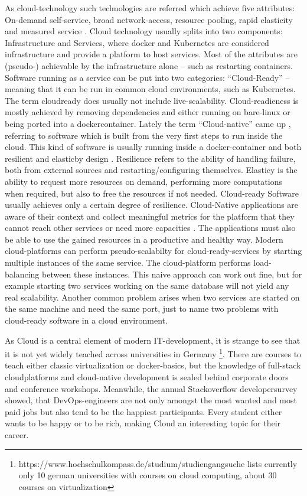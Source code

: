 \documentclass[utf8]{lni}
\begin{document}
As cloud-technology such technologies are referred which achieve five attributes: 
On-demand self-service, broad network-access, resource pooling, rapid elasticity and measured service \cite{ME11}. 
Cloud technology usually splits into two components:  Infrastructure  and  Services,  where  docker and Kubernetes are considered infrastructure and provide a  platform  to  host  services.  
Most  of  the  attributes  are (pseudo-) achievable by the infrastructure alone – such as restarting containers. 
Software running as a service can be put into two categories: 
“Cloud-Ready” – meaning that it can be run in common cloud environments, such as Kubernetes. 
The term cloudready  does  usually  not  include  live-scalability. Cloud-readieness is mostly achieved by removing dependencies and either running on bare-linux or being ported into a dockercontainer. 
Lately the term “Cloud-native” came up \cite{BI17}, referring to software which is built from the very first steps to run inside the cloud. This kind of software is usually running inside a docker-container and both resilient and elasticby design \cite{TO17}.  
Resilience refers to the ability of handling failure, both from external sources and restarting/configuring themselves.  
Elasticy is the ability to request more resources on demand, performing more computations when required, but also to free the resources if not needed. 
Cloud-ready Software usually achieves only a certain degree of resilience.   
Cloud-Native applications are aware of their context and collect meaningful metrics for the platform that they cannot reach other services or need more capacities \cite{MIN18}. 
The applications must also be able to use the gained resources in a productive and healthy way.  
Modern  cloud-platforms  can  perform  pseudo-scalabilty for cloud-ready-services by starting multiple instances of the same service. 
The cloud-platform performs load-balancing between these instances. 
This naive approach can work out fine, but for example starting two services working on the same database will not yield any real scalability. 
Another common problem arises when two services are started on the same machine and need the same port, just to name two problems with cloud-ready  software in a cloud environment. 

As Cloud is a central element of modern IT-development, it is strange to see that it is not yet widely teached across 
universities in Germany \footnote{https://www.hochschulkompass.de/studium/studiengangsuche lists currently only 10 german universities with courses on cloud computing, about 30 courses on virtualization }.
There are courses to teach either classic virtualization or docker-basics, but the knowledge of full-stack cloudplatforms and cloud-native development is sealed behind corporate doors and conference workshops.
Meanwhile,  the  annual  Stackoverflow  developersurvey \cite{SO19} showed, that DevOps-engineers are not only 
amongst the most wanted and most paid jobs but also tend to be the happiest participants.  
Every student either wants to be happy or to be rich, making Cloud an interesting topic for their career. 
\end{document}
